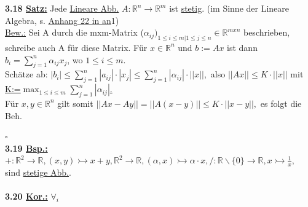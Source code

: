 \documentclass[]{scrartcl}
\begin{document}
	\textbf{3.18 \underline{Satz:}} Jede  \ul{Lineare Abb.} 
	$A:\mathbb{R}^n\rightarrow\mathbb{R}^m$ ist \ul{stetig}. (im Sinne der 
	Lineare Algebra, s. \ul{Anhang 22 in an}1)\\
	\underline{Bew.:} Sei A durch die mxm-Matrix ($\alpha_{ij})_{1\leq i\leq 
	m|1\leq j\leq n}\in\mathbb{R}^{mxn}$ beschrieben, schreibe auch A für diese 
	Matrix. Für $x \in \mathbb{R}^n$ und $b:=Ax$ ist dann 
	$b_i=\sum_{j=1}^{n}\alpha_{ij}x_j$, wo $1\leq i \leq m$.\\
	Schätze ab: \ul{$|b_i|\leq 
	\sum_{j=1}^{n}|a_{ij}|\cdot|x_j|\leq 
	\sum_{j=1}^{n}|\alpha_{ij}|\cdot||x||,$} also \ul{$||Ax||\leq K\cdot||x||$}
	mit \ul{K:=$\max_{1\leq i\leq m}\sum_{j=1}^{n}|\alpha_{ij}|$.}\\
	Für $x,y\in\mathbb{R}^n$ gilt somit $||Ax-Ay||=||A(x-y)||\leq K\cdot 
	||x-y||,$ es folgt die Beh.\\
	\strut\hfill$\square$\\
	\textbf{3.19 \underline{Bsp.:}} $+:\mathbb{R}^2\rightarrow\mathbb{R}, 
	(x,y)\rightarrowtail x+y, \mathbb{R}^2\rightarrow\mathbb{R}, 
	(\alpha,x)\rightarrowtail \alpha\cdot x, 
	/:\mathbb{R}\backslash\{0\}\rightarrow\mathbb{R}, 
	x\rightarrowtail\frac{1}{x},$\\
	sind \ul{stetige Abb.}.\\
	\\
	\textbf{3.20 \underline{Kor.:}} $\forall_i$
	
	
	
		
\end{document}
